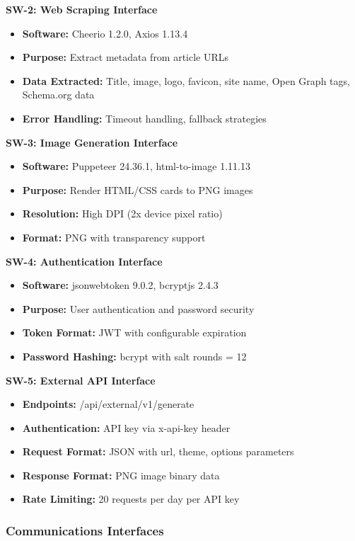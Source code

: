 \documentclass[12pt,a4paper]{article}
\begin{document}
\textbf{SW-2: Web Scraping Interface}
\begin{itemize}
    \item \textbf{Software:} Cheerio 1.2.0, Axios 1.13.4
    \item \textbf{Purpose:} Extract metadata from article URLs
    \item \textbf{Data Extracted:} Title, image, logo, favicon, site name, Open Graph tags, Schema.org data
    \item \textbf{Error Handling:} Timeout handling, fallback strategies
\end{itemize}

\textbf{SW-3: Image Generation Interface}
\begin{itemize}
    \item \textbf{Software:} Puppeteer 24.36.1, html-to-image 1.11.13
    \item \textbf{Purpose:} Render HTML/CSS cards to PNG images
    \item \textbf{Resolution:} High DPI (2x device pixel ratio)
    \item \textbf{Format:} PNG with transparency support
\end{itemize}

\textbf{SW-4: Authentication Interface}
\begin{itemize}
    \item \textbf{Software:} jsonwebtoken 9.0.2, bcryptjs 2.4.3
    \item \textbf{Purpose:} User authentication and password security
    \item \textbf{Token Format:} JWT with configurable expiration
    \item \textbf{Password Hashing:} bcrypt with salt rounds = 12
\end{itemize}

\textbf{SW-5: External API Interface}
\begin{itemize}
    \item \textbf{Endpoints:} /api/external/v1/generate
    \item \textbf{Authentication:} API key via x-api-key header
    \item \textbf{Request Format:} JSON with url, theme, options parameters
    \item \textbf{Response Format:} PNG image binary data
    \item \textbf{Rate Limiting:} 20 requests per day per API key
\end{itemize}

\subsubsection{Communications Interfaces}
\end{document}
